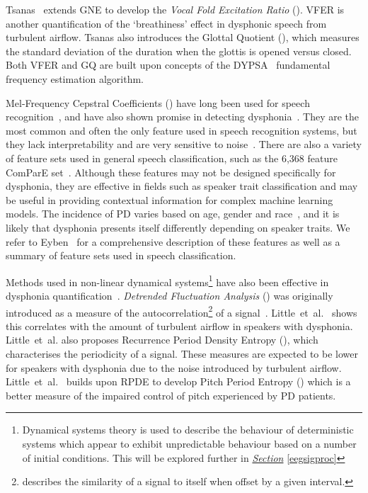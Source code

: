 \documentclass[12pt, twoside]{book}
\renewcommand\emph[1]{\textit{\color{USred}{#1}}}
\begin{document}



Tsanas~\cite{spoverview} extends GNE to develop the \textit{Vocal Fold Excitation Ratio} (\emph{VFER}). VFER is another quantification of the `breathiness' effect in dysphonic speech from turbulent airflow. Tsanas also introduces the Glottal Quotient (\emph{GQ}), which measures the standard deviation of the duration when the glottis is opened versus closed. Both VFER and GQ are built upon concepts of the DYPSA~\cite{dypsa} fundamental frequency estimation algorithm. 

Mel-Frequency Cepstral Coefficients (\emph{MFCC}) have long been used for speech recognition~\cite{mfcc}, and have also shown promise in detecting dysphonia~\cite{mfccml}. They are the most common and often the only feature used in speech recognition systems, but they lack interpretability and are very sensitive to noise~\cite{mfccrobust}. There are also a variety of feature sets used in general speech classification, such as the 6,368 feature ComParE set~\cite{is2013}. Although these features may not be designed specifically for dysphonia, they are effective in fields such as speaker trait classification and may be useful in providing contextual information for complex machine learning models. The incidence of PD varies based on age, gender and race~\cite{ageracial,racial}, and it is likely that dysphonia presents itself differently depending on speaker traits. We refer to Eyben~\cite{ostextbook} for a comprehensive description of these features as well as a summary of feature sets used in speech classification.


\label{dfadescription}
Methods used in non-linear dynamical systems\footnote{Dynamical systems theory is used to describe the behaviour of deterministic systems which appear to exhibit unpredictable behaviour based on a number of initial conditions. This will be explored further in \textit{\hyperref[eegsigproc]{Section}} \ref{eegsigproc}} have also been effective in dysphonia quantification~\cite{splittlenonlinear2007}. \textit{Detrended Fluctuation Analysis} (\emph{DFA}) was originally introduced as a measure of the autocorrelation\footnote{\emph{Autocorrelation} describes the similarity of a signal to itself when offset by a given interval.} of a signal~\cite{dfa}. Little~et~al.~\cite{splittlenonlinear2007} shows this correlates with the amount of turbulent airflow in speakers with dysphonia. Little~et~al. also proposes Recurrence Period Density Entropy (\emph{RPDE}), which characterises the periodicity of a signal. These measures are expected to be lower for speakers with dysphonia due to the noise introduced by turbulent airflow. Little~et~al.~\cite{splittledysphonia2009} builds upon RPDE to develop Pitch Period Entropy (\emph{PPE}) which is a better measure of the impaired control of pitch experienced by PD patients.
\end{document}
